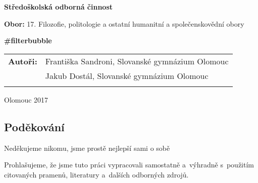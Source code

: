 \pagestyle{empty}
\begin{center}

\medskip

\vfill
{\bfseries\Large{Středoškolská odborná činnost}}

\medskip

{{\bfseries Obor: } 17. Filozofie, politologie a ostatní humanitní a společenskovědní obory}
\vfill


\vspace{20mm}

{\LARGE\bfseries \#filterbubble}

\vfill

\begin{tabular}{ll}
\bfseries Autoři: & Františka Sandroni,\hspace{0.153cm} Slovanské gymnázium Olomouc\\
                  & Jakub Dostál, Slovanské gymnázium Olomouc\\
\noalign{\vspace{2mm}}
\end{tabular}

\vfill
Olomouc 2017
\end{center}


\newpage
\openright

\noindent
\subsection*{Poděkování}
\noindent Neděkujeme nikomu, jsme prostě nejlepší sami o sobě



\newpage

\noindent
Prohlašujeme, že jsme tuto práci vypracovali samostatně a~výhradně
s~použitím citovaných pramenů, literatury a~dalších odborných zdrojů.

